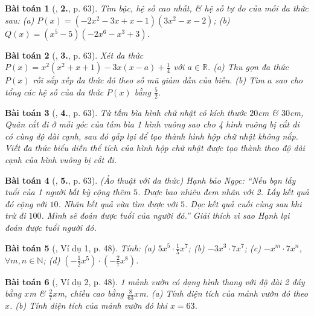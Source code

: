 \documentclass{article}
\numberwithin{equation}{section}
\newtheorem{baitoan}{Bài toán}
\begin{document}
\begin{baitoan}[\cite{SGK_Toan_7_Canh_Dieu_tap_2}, \textbf{2.}, p. 63]
	Tìm bậc, hệ số cao nhất, \& hệ số tự do của mỗi đa thức sau: (a) $P(x) = (-2x^2 - 3x + x - 1)(3x^2 - x - 2)$; (b) $Q(x) = (x^5 - 5)(-2x^6 - x^3 + 3)$.
\end{baitoan}

\begin{baitoan}[\cite{SGK_Toan_7_Canh_Dieu_tap_2}, \textbf{3.}, p. 63]
	Xét đa thức $P(x) = x^2(x^2 + x + 1) - 3x(x - a) + \frac{1}{4}$ với $a\in\mathbb{R}$. (a) Thu gọn đa thức $P(x)$ rồi sắp xếp đa thức đó theo số mũ giảm dần của biến. (b) Tìm $a$ sao cho tổng các hệ số của đa thức $P(x)$ bằng $\frac{5}{2}$.
\end{baitoan}

\begin{baitoan}[\cite{SGK_Toan_7_Canh_Dieu_tap_2}, \textbf{4.}, p. 63]
	Từ tấm bìa hình chữ nhật có kích thước $20$\emph{cm} \& $30$\emph{cm}, Quân cắt đi ở mỗi góc của tấm bìa 1 hình vuông sao cho 4 hình vuông bị cắt đi có cùng độ dài cạnh, sau đó gấp lại để tạo thành hình hộp chữ nhật không nắp. Viết đa thức biểu diễn thể tích của hình hộp chữ nhật được tạo thành theo độ dài cạnh của hình vuông bị cắt đi.
\end{baitoan}

\begin{baitoan}[\cite{SGK_Toan_7_Canh_Dieu_tap_2}, \textbf{5.}, p. 63]
	\emph{(Ảo thuật với đa thức)} Hạnh bảo Ngọc: ``Nếu bạn lấy tuổi của 1 người bất kỳ cộng thêm $5$. Được bao nhiêu đem nhân với 2. Lấy kết quả đó cộng với $10$. Nhân kết quả vừa tìm được với $5$. Đọc kết quả cuối cùng sau khi trừ đi $100$. Mình sẽ đoán được tuổi của người đó.'' Giải thích vì sao Hạnh lại đoán được tuổi người đó.
\end{baitoan}

\begin{baitoan}[\cite{SBT_Toan_7_Canh_Dieu_tap_2}, Ví dụ 1, p. 48]
	Tính: (a) $5x^5\cdot\frac{1}{5}x^7$; (b) $-3x^3\cdot7x^7$; (c) $-x^m\cdot7x^n$, $\forall m,n\in\mathbb{N}$; (d) $\left(-\frac{1}{2}x^5\right)\cdot\left(-\frac{2}{7}x^8\right)$.
\end{baitoan}

\begin{baitoan}[\cite{SBT_Toan_7_Canh_Dieu_tap_2}, Ví dụ 2, p. 48]
	1 mảnh vườn có dạng hình thang với độ dài 2 đáy bằng $x$\emph{m} \& $\frac{2}{7}x$\emph{m}, chiều cao bằng $\frac{8}{63}x$\emph{m}. (a) Tính diện tích của mảnh vườn đó theo $x$. (b) Tính diện tích của mảnh vườn đó khi $x = 63$.
\end{baitoan}
\end{document}
